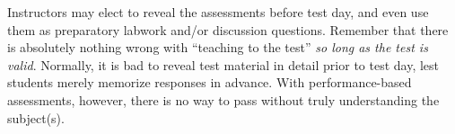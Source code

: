 Instructors may elect to reveal the assessments before test day, and even use them as preparatory labwork and/or discussion questions.  Remember that there is absolutely nothing wrong with ``teaching to the test'' {\it so long as the test is valid}.  Normally, it is bad to reveal test material in detail prior to test day, lest students merely memorize responses in advance.  With performance-based assessments, however, there is no way to pass without truly understanding the subject(s).

